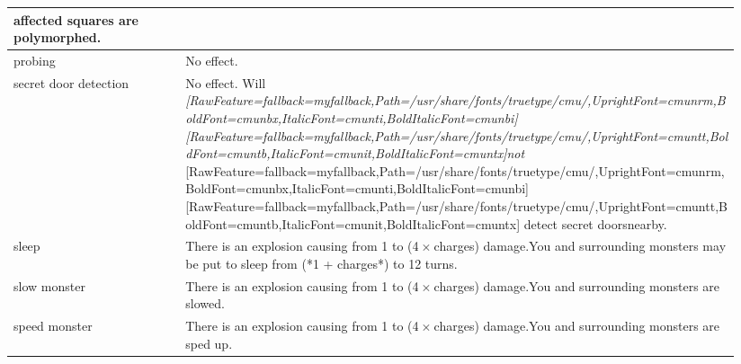 \begin{longtable}{|>{\RaggedRight}p{0.22451\linewidth}|>{\RaggedRight}p{0.71835\linewidth}|}
affected squares are polymorphed.\\ \hline \hspace*{0pt}\ignorespaces{}\hspace*{0pt}probing&\hspace*{0pt}\ignorespaces{}\hspace*{0pt}No effect.\\ \hline \hspace*{0pt}\ignorespaces{}\hspace*{0pt}secret door detection&\hspace*{0pt}\ignorespaces{}\hspace*{0pt}No effect. Will {\itshape \allowbreak{}\setmainfont{cmunti.ttf}[RawFeature={fallback=myfallback},Path=/usr/share/fonts/truetype/cmu/,UprightFont=cmunrm,BoldFont=cmunbx,ItalicFont=cmunti,BoldItalicFont=cmunbi]\setmonofont{cmunti.ttf}[RawFeature={fallback=myfallback},Path=/usr/share/fonts/truetype/cmu/,UprightFont=cmuntt,BoldFont=cmuntb,ItalicFont=cmunit,BoldItalicFont=cmuntx]\itshape not}{$\text{ }$}\allowbreak{}\setmainfont{cmunrm.ttf}[RawFeature={fallback=myfallback},Path=/usr/share/fonts/truetype/cmu/,UprightFont=cmunrm,BoldFont=cmunbx,ItalicFont=cmunti,BoldItalicFont=cmunbi]\setmonofont{cmunrm.ttf}[RawFeature={fallback=myfallback},Path=/usr/share/fonts/truetype/cmu/,UprightFont=cmuntt,BoldFont=cmuntb,ItalicFont=cmunit,BoldItalicFont=cmuntx] detect secret doors\footnotemark[138] nearby.\\ \hline \hspace*{0pt}\ignorespaces{}\hspace*{0pt}sleep&\hspace*{0pt}\ignorespaces{}\hspace*{0pt}There is an explosion causing from 1 to (4{\mbox{$~$}}{\mbox{$\times$}}{\mbox{$~$}}charges) damage.\newline{}You and surrounding monsters may be put to sleep from (*1 + charges*) to 12 turns.\\ \hline \hspace*{0pt}\ignorespaces{}\hspace*{0pt}slow monster&\hspace*{0pt}\ignorespaces{}\hspace*{0pt}There is an explosion causing from 1 to (4{\mbox{$~$}}{\mbox{$\times$}}{\mbox{$~$}}charges) damage.\newline{}You and surrounding monsters are slowed.\\ \hline \hspace*{0pt}\ignorespaces{}\hspace*{0pt}speed monster&\hspace*{0pt}\ignorespaces{}\hspace*{0pt}There is an explosion causing from 1 to (4{\mbox{$~$}}{\mbox{$\times$}}{\mbox{$~$}}charges) damage.\newline{}You and surrounding monsters are sped up.\\ \hline 
\end{longtable}
